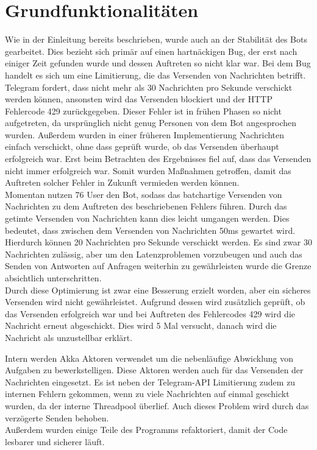 \section{Grundfunktionalitäten}
Wie in der Einleitung bereits beschrieben, wurde auch an der Stabilität des Bots gearbeitet. Dies bezieht sich primär auf einen hartnäckigen Bug, der erst nach einiger Zeit gefunden wurde und dessen Auftreten so nicht klar war.
Bei dem Bug handelt es sich um eine Limitierung, die das Versenden von Nachrichten betrifft. Telegram fordert, dass nicht mehr als 30 Nachrichten pro Sekunde verschickt werden können, ansonsten wird das Versenden blockiert und  der HTTP Fehlercode 429 zurückgegeben. Dieser Fehler ist in frühen Phasen so nicht aufgetreten, da ursprünglich nicht genug Personen von dem Bot angesprochen wurden. Außerdem wurden in einer früheren Implementierung Nachrichten einfach verschickt, ohne dass geprüft wurde, ob das Versenden überhaupt erfolgreich war. Erst beim Betrachten des Ergebnisses fiel auf, dass das Versenden nicht immer erfolgreich war. Somit wurden Maßnahmen getroffen, damit das Auftreten solcher Fehler in Zukunft vermieden werden können. \\
Momentan nutzen 76 User den Bot, sodass das batchartige Versenden von Nachrichten zu dem Auftreten des beschriebenen Fehlers führen. Durch das getimte Versenden von Nachrichten kann dies leicht umgangen werden. Dies bedeutet, dass zwischen dem Versenden von Nachrichten 50ms gewartet wird. Hierdurch können 20 Nachrichten pro Sekunde verschickt werden. Es sind zwar 30 Nachrichten zulässig, aber um den Latenzproblemen vorzubeugen und auch das Senden von Antworten auf Anfragen weiterhin zu gewährleisten wurde die Grenze absichtlich unterschritten. \\
Durch diese Optimierung ist zwar eine Besserung erzielt worden, aber ein sicheres Versenden wird nicht gewährleistet. Aufgrund dessen wird zusätzlich geprüft, ob das Versenden erfolgreich war und bei Auftreten des Fehlercodes 429 wird die Nachricht erneut abgeschickt. Dies wird 5 Mal versucht, danach wird die Nachricht als unzustellbar erklärt.

Intern werden Akka Aktoren verwendet um die nebenläufige Abwicklung von Aufgaben zu bewerkstelligen. Diese Aktoren werden auch für das Versenden der Nachrichten eingesetzt. Es ist neben der Telegram-API Limitierung zudem zu internen Fehlern gekommen, wenn zu viele Nachrichten auf einmal geschickt wurden, da der interne Threadpool überlief. Auch dieses Problem wird durch das verzögerte Senden behoben. \\
Außerdem wurden einige Teile des Programms refaktoriert, damit der Code lesbarer und sicherer läuft.
